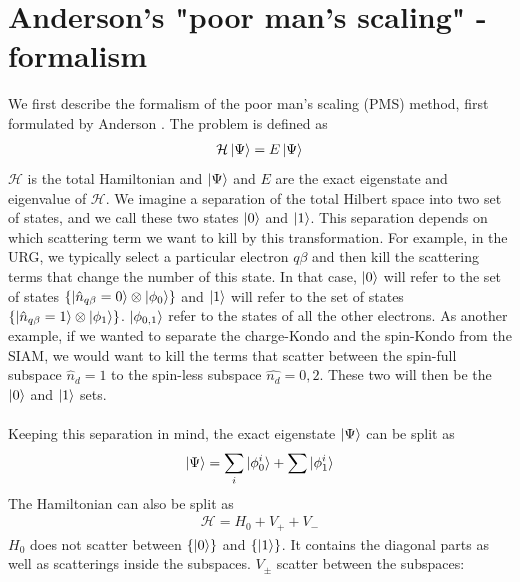 \documentclass[twoside,11pt]{report}
\numberwithin{equation}{section}
\begin{document}
\section{Anderson's "poor man's scaling" - formalism}
We first describe the formalism of the poor man's scaling (PMS) method, first formulated by Anderson \cite{Anderson}. The problem is defined as
\begin{equation}\begin{aligned}
	\label{problem}
\mathcal{H}\ket{\Psi} = E\ket{\Psi}
\end{aligned}\end{equation}
\(\mathcal{H}\) is the total Hamiltonian and \(\ket{\Psi}\) and \(E\) are the exact eigenstate and eigenvalue of \(\mathcal{H}\). We imagine a separation of the total Hilbert space into two set of states, and we call these two states \(\ket{0}\) and \(\ket{1}\). This separation depends on which scattering term we want to kill by this transformation. For example, in the URG, we typically select a particular electron \(q\beta\) and then kill the  scattering terms that change the number of this state. In that case, \(\ket{0}\) will refer to the set of states \(\left\{\ket{\hat n_{q\beta}=0}\otimes\ket{\phi_0}\right\}\) and \(\ket{1}\) will refer to the set of states \(\left\{\ket{\hat n_{q\beta}=1}\otimes\ket{\phi_1}\right\}\). \(\ket{\phi_{0,1}}\) refer to the states of all the other electrons. As another example, if we wanted to separate the charge-Kondo and the spin-Kondo from the SIAM, we would want to kill the terms that scatter between the spin-full subspace \(\hat n_d=1\) to the spin-less subspace \(\hat{n_d}=0,2\). These two will then be the \(\ket{0}\) and \(\ket{1}\) sets. 
\\\\Keeping this separation in mind, the exact eigenstate \(\ket{\Psi}\) can be split as 
\begin{equation}\begin{aligned}
\ket{\Psi} = \sum_i \ket{\phi_0^i} + \sum \ket{\phi_1^i}
\end{aligned}\end{equation}
The Hamiltonian can also be split as 
\begin{equation}\begin{aligned}
\mathcal{H} = H_0 + V_+ + V_-
\end{aligned}\end{equation}
\(H_0\) does not scatter between \(\left\{\ket{0}\right\}\) and \(\left\{\ket{1}\right\}\). It contains the diagonal parts as well as scatterings inside the subspaces. \(V_\pm\) scatter between the subspaces:
\end{document}
